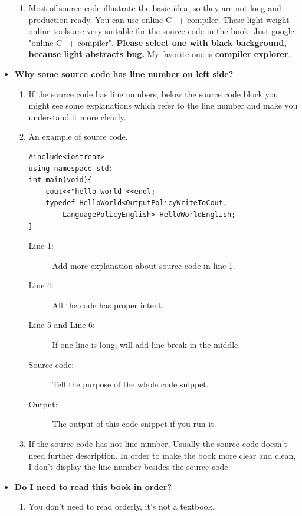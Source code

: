 \documentclass[a4paper,11pt,twoside]{book}
\begin{document}
\begin{itemize}
\begin{enumerate}
		\item Most of source code illustrate the basic idea, so they are not long and production ready. You can use online C++ compiler. These light weight online tools are very suitable for the source code in the book. Just google "online C++ compiler". \textbf{Please select one with black background, because light abstracts bug.} My favorite one is \textbf{compiler explorer}. 
	\end{enumerate}
	\item \textbf{Why some source code has line number on left side?}
	\begin{enumerate}
		\item If the source code has line numbers, below the source code block you might see some explanations which refer to the line number and make you understand it more clearly.

		\item An example of source code.
		
\begin{lstlisting}
#include<iostream>
using namespace std:
int main(void){
	cout<<"hello world"<<endl;
	typedef HelloWorld<OutputPolicyWriteToCout, 
		LanguagePolicyEnglish> HelloWorldEnglish;
}
\end{lstlisting}

\begin{description}
	\item[Line 1:] Add more explanation about source code in line 1.
	\item[Line 4:] All the code has proper intent.
	\item[Line 5 and Line 6:] If one line is long, will add line break in the middle. 
	\item[Source code:] Tell the purpose of the whole code snippet.
	\item[Output:] The output of this code snippet if you run it.
\end{description}

		\item If the source code has not line number, Usually the source code doesn't need further description. In order to make the book more clear and clean, I don't display the line number besides the source code.
	\end{enumerate}

	\item \textbf{Do I need to read this book in order?}
	\begin{enumerate}
	\item You don't need to read orderly, it's not a textbook.


\end{enumerate}
\end{itemize}
\end{document}
